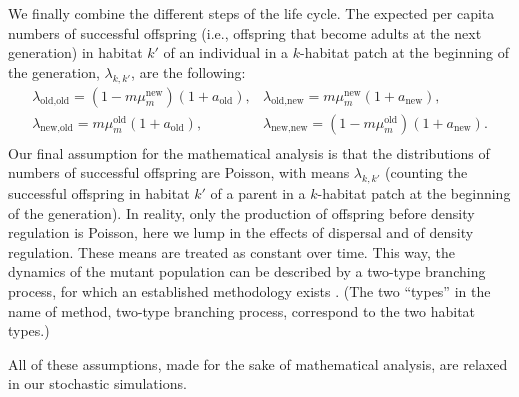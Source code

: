 \documentclass[11pt]{article}
\begin{document}
We finally combine the different steps of the life cycle. The expected per capita numbers of successful offspring  (i.e., offspring that become adults at the next generation) in habitat $k'$ of an individual in a $k$-habitat patch at the beginning of the generation, $\lambda_{k, k'}$, are the following:
%
\begin{equation}\label{eq:lambda}
\begin{array}{ll}
\lambda_{\text{old}, \text{old}} = \left(1 - m \mu_m^{\text{new}} \right) (1+a_{\text{old}}) , & 
\lambda_{\text{old}, \text{new}} = m \mu_m^{\text{new}} (1+a_{\text{new}}) ,\\
%
\lambda_{\text{new}, \text{old}} =  m \mu_m^{\text{old}} (1+a_{\text{old}}) , & 
\lambda_{\text{new}, \text{new}} = \left(1 - m \mu_m^{\text{old}}\right) (1+a_{\text{new}}) .\\
\end{array}
\end{equation}
Our final assumption for the mathematical analysis is that the distributions of numbers of successful offspring are Poisson, with means $\lambda_{k, k'}$ (counting the successful offspring in habitat $k'$ of a parent in a $k$-habitat patch at the beginning of the generation). In reality, only the production of offspring before density regulation is Poisson, here we lump in the effects of dispersal and of density regulation. These means are treated as constant over time. 
This way, the dynamics of the mutant population can be described by a two-type branching process, for which an established methodology exists \citep{haccou_book}. (The two ``types'' in the name of method, two-type branching process, correspond to the two habitat types.)  

 All of these assumptions, made for the sake of mathematical analysis, are relaxed in our stochastic simulations.
\end{document}
